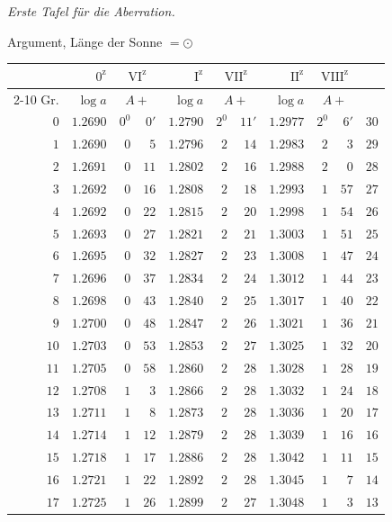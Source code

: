 \begin{center}
\textit{Erste Tafel für die Aberration.}\par\medskip
Argument, Länge der Sonne $=\odot$\par\medskip
\begingroup\small\setlength{\tabcolsep}{5pt}
\begin{tabular}{r||r|rr||r|rr||r|rr||r}
&$0^{\mathrm z}$&\multicolumn{2}{c||}{$\mathrm{VI}^{\mathrm z}$}&$\mathrm I^{\mathrm z}$&\multicolumn{2}{c||}{$\mathrm{VII}^{\mathrm z}$}&$\mathrm{II}^{\mathrm z}$&\multicolumn{2}{c||}{$\mathrm{VIII}^{\mathrm z}$}&\\\cline{2-10}
Gr.&$\log a$&\multicolumn{2}{c||}{$A+$}&$\log a$&\multicolumn{2}{c||}{$A+$}&$\log a$&\multicolumn{2}{c||}{$A+$}&\\\hline
$0$&$1.2690$&$0^0$&$0'$&$1.2790$&$2^0$&$11'$&$1.2977$&$2^0$&$6'$&$30$\\
$1$&$1.2690$&$0$&$5$&$1.2796$&$2$&$14$&$1.2983$&$2$&$3$&$29$\\
$2$&$1.2691$&$0$&$11$&$1.2802$&$2$&$16$&$1.2988$&$2$&$0$&$28$\\
$3$&$1.2692$&$0$&$16$&$1.2808$&$2$&$18$&$1.2993$&$1$&$57$&$27$\\
$4$&$1.2692$&$0$&$22$&$1.2815$&$2$&$20$&$1.2998$&$1$&$54$&$26$\\
$5$&$1.2693$&$0$&$27$&$1.2821$&$2$&$21$&$1.3003$&$1$&$51$&$25$\\
$6$&$1.2695$&$0$&$32$&$1.2827$&$2$&$23$&$1.3008$&$1$&$47$&$24$\\
$7$&$1.2696$&$0$&$37$&$1.2834$&$2$&$24$&$1.3012$&$1$&$44$&$23$\\
$8$&$1.2698$&$0$&$43$&$1.2840$&$2$&$25$&$1.3017$&$1$&$40$&$22$\\
$9$&$1.2700$&$0$&$48$&$1.2847$&$2$&$26$&$1.3021$&$1$&$36$&$21$\\
$10$&$1.2703$&$0$&$53$&$1.2853$&$2$&$27$&$1.3025$&$1$&$32$&$20$\\
$11$&$1.2705$&$0$&$58$&$1.2860$&$2$&$28$&$1.3028$&$1$&$28$&$19$\\
$12$&$1.2708$&$1$&$3$&$1.2866$&$2$&$28$&$1.3032$&$1$&$24$&$18$\\
$13$&$1.2711$&$1$&$8$&$1.2873$&$2$&$28$&$1.3036$&$1$&$20$&$17$\\
$14$&$1.2714$&$1$&$12$&$1.2879$&$2$&$28$&$1.3039$&$1$&$16$&$16$\\
$15$&$1.2718$&$1$&$17$&$1.2886$&$2$&$28$&$1.3042$&$1$&$11$&$15$\\
$16$&$1.2721$&$1$&$22$&$1.2892$&$2$&$28$&$1.3045$&$1$&$7$&$14$\\
$17$&$1.2725$&$1$&$26$&$1.2899$&$2$&$27$&$1.3048$&$1$&$3$&$13$\\

\end{tabular}
\end{center}
